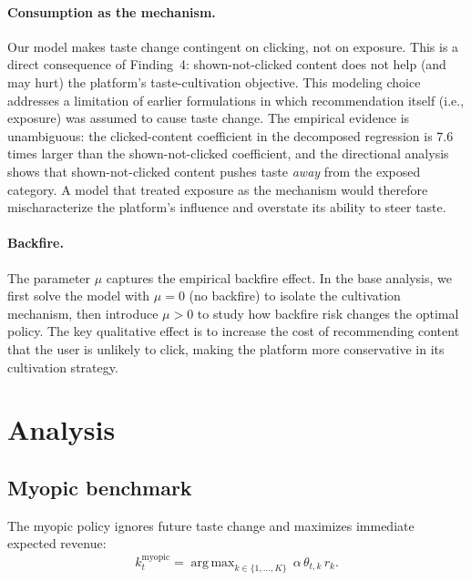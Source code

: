 \documentclass[11pt]{article}
\DeclareMathOperator*{\argmax}{arg\,max}
\begin{document}
\paragraph{Consumption as the mechanism.} Our model makes taste change contingent on clicking, not on exposure. This is a direct consequence of Finding~4: shown-not-clicked content does not help (and may hurt) the platform's taste-cultivation objective. This modeling choice addresses a limitation of earlier formulations in which recommendation itself (i.e., exposure) was assumed to cause taste change. The empirical evidence is unambiguous: the clicked-content coefficient in the decomposed regression is 7.6 times larger than the shown-not-clicked coefficient, and the directional analysis shows that shown-not-clicked content pushes taste \emph{away} from the exposed category. A model that treated exposure as the mechanism would therefore mischaracterize the platform's influence and overstate its ability to steer taste.

\paragraph{Backfire.} The parameter $\mu$ captures the empirical backfire effect. In the base analysis, we first solve the model with $\mu = 0$ (no backfire) to isolate the cultivation mechanism, then introduce $\mu > 0$ to study how backfire risk changes the optimal policy. The key qualitative effect is to increase the cost of recommending content that the user is unlikely to click, making the platform more conservative in its cultivation strategy.

\section{Analysis}
\label{sec:analysis}

\subsection{Myopic benchmark}

The myopic policy ignores future taste change and maximizes immediate expected revenue:
\begin{equation}\label{eq:myopic}
k_t^{\text{myopic}} = \argmax_{k \in \{1,\ldots,K\}} \, \alpha \, \theta_{t,k} \, r_k.
\end{equation}
\end{document}
